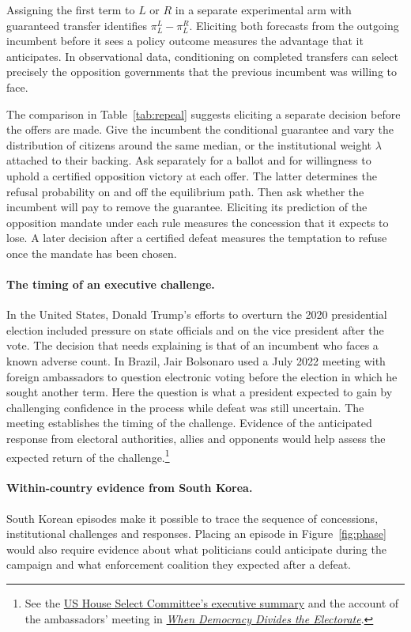 \documentclass[11pt,letterpaper]{article}
\newcommand{\refsource}[2]{\href{#1}{#2}}
\begin{document}
Assigning the first term to $L$ or $R$ in a separate experimental arm with guaranteed transfer identifies $\pi_L^L-\pi_L^R$. Eliciting both forecasts from the outgoing incumbent before it sees a policy outcome measures the advantage that it anticipates. In observational data, conditioning on completed transfers can select precisely the opposition governments that the previous incumbent was willing to face.

The comparison in Table~\ref{tab:repeal} suggests eliciting a separate decision before the offers are made. Give the incumbent the conditional guarantee and vary the distribution of citizens around the same median, or the institutional weight $\lambda$ attached to their backing. Ask separately for a ballot and for willingness to uphold a certified opposition victory at each offer. The latter determines the refusal probability on and off the equilibrium path. Then ask whether the incumbent will pay to remove the guarantee. Eliciting its prediction of the opposition mandate under each rule measures the concession that it expects to lose. A later decision after a certified defeat measures the temptation to refuse once the mandate has been chosen.

\paragraph{The timing of an executive challenge.}
In the United States, Donald Trump's efforts to overturn the 2020 presidential election included pressure on state officials and on the vice president after the vote. The decision that needs explaining is that of an incumbent who faces a known adverse count. In Brazil, Jair Bolsonaro used a July 2022 meeting with foreign ambassadors to question electronic voting before the election in which he sought another term. Here the question is what a president expected to gain by challenging confidence in the process while defeat was still uncertain. The meeting establishes the timing of the challenge. Evidence of the anticipated response from electoral authorities, allies and opponents would help assess the expected return of the challenge.\footnote{See the \refsource{https://www.govinfo.gov/content/pkg/GPO-J6-REPORT/pdf/GPO-J6-REPORT-1-6.pdf}{US House Select Committee's executive summary} and the account of the ambassadors' meeting in \refsource{https://doi.org/10.1590/1981-3821202500020003}{\emph{When Democracy Divides the Electorate}}.}

\paragraph{Within-country evidence from South Korea.}
South Korean episodes make it possible to trace the sequence of concessions, institutional challenges and responses. Placing an episode in Figure~\ref{fig:phase} would also require evidence about what politicians could anticipate during the campaign and what enforcement coalition they expected after a defeat.
\end{document}

